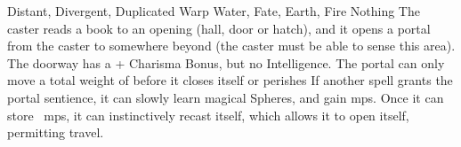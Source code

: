   {Distant, Divergent, Duplicated}%
  {Warp}%
  {Water, Fate, Earth, Fire}%
  {Nothing}%
  {The caster reads a book to an opening (hall, door or hatch), and it opens a portal from the caster to somewhere beyond \spellRange
  (the caster must be able to sense this area).
  The doorway has a + Charisma Bonus, but no Intelligence.
  The portal can only move a total \gls{weight} of  before it closes itself or perishes}%
  {
  If another spell grants the portal sentience, it can slowly learn magical Spheres, and gain \glspl{mp}.
  Once it can store ~\glspl{mp}, it can instinctively recast itself, which allows it to open itself, permitting travel.}
